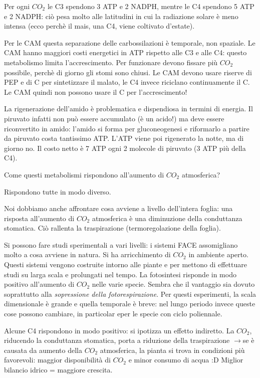 \documentclass[a4paper,12pt]{book}
\newcommand{\lfreccia}{\ensuremath{\longrightarrow}}
\begin{document}
Per ogni  $CO_{2}$ le C3 spendono 3 ATP e 2 NADPH, mentre le C4 spendono 5 ATP e 2 NADPH: ciò pesa molto alle latitudini in cui la radiazione solare è meno intensa (ecco perchè il mais, una C4, viene coltivato d'estate).

Per le CAM questa separazione delle carbossilazioni è temporale, non spaziale. Le CAM hanno maggiori costi energetici in ATP rispetto alle C3 e alle C4: questo metabolismo limita l'accrescimento. Per funzionare devono fissare più $CO_{2}$  possibile, perchè di giorno gli stomi sono chiusi. Le CAM devono usare riserve di PEP e di C per sintetizzare il malato, le  C4 invece riciclano continuamente il C. Le CAM quindi non possono usare il C per l'accrescimento!

La rigenerazione dell'amido è problematica e dispendiosa in termini di energia. Il piruvato infatti non può essere accumulato (è un acido!) ma deve essere riconvertito in amido: l'amido si forma per gluconeogenesi e riformarlo a partire da piruvato costa tantissimo ATP. L'ATP viene poi rigenerato la notte, ma di giorno no. Il costo netto è 7 ATP ogni 2 molecole di piruvato (3 ATP più della C4).

Come questi metabolismi rispondono all'aumento di $CO_{2}$  atmosferica?

Rispondono tutte in modo diverso.

Noi dobbiamo anche affrontare cosa avviene a livello dell'intera foglia: una risposta all'aumento di $CO_{2}$  atmosferica è una diminuzione della conduttanza stomatica. Ciò rallenta la traspirazione (termoregolazione della foglia).

Si possono fare studi sperimentali a vari livelli: i sistemi FACE assomigliano molto a cosa avviene in natura. Si ha arricchimento di $CO_{2}$  in ambiente aperto. Questi sistemi vengono costruite intorno alle piante e per mettono di effettuare studi su larga scala e prolungati nel tempo. La fotosintesi risponde in modo positivo all'aumento di $CO_{2}$  nelle varie specie. Sembra che il vantaggio sia dovuto soprattutto alla \emph{sopressione della fotorespirazione}. Per questi esperimenti, la scala dimensionale è grande e quella temporale è breve: nel lungo periodo invece queste cose possono cambiare, in particolar eper le specie con ciclo poliennale. 

Alcune C4 rispondono in modo positivo: si ipotizza un effetto indiretto. La $CO_{2}$, riducendo la conduttanza stomatica, porta a riduzione della traspirazione \lfreccia se è causata da aumento della $CO_{2}$ atmosferica, la pianta si trova in condizioni più favorevoli: maggior disponibilità di $CO_{2}$ e minor consumo di acqua :D Miglior bilancio idrico = maggiore crescita.
    
\end{document}
